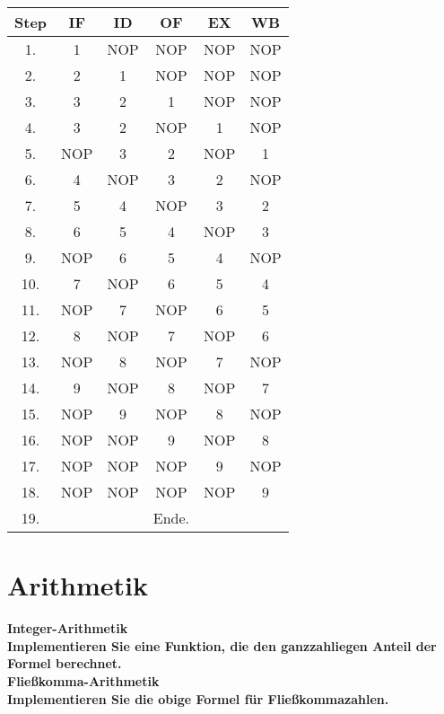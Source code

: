 \documentclass[11pt]{article}
\newcommand{\aufgabe}[1]{\item{\bf #1}}
\begin{document}
\begin{center}
\begin{tabular}{c|c|c|c|c|c}
    Step & IF & ID & OF & EX & WB \\
    \hline
    1. & 1 & NOP & NOP & NOP & NOP \\
    2. & 2 & 1 & NOP & NOP & NOP \\
    3. & 3 & 2 & 1 & NOP & NOP \\
    4. & 3 & 2 & NOP & 1 & NOP \\
    5. & NOP & 3 & 2 & NOP & 1 \\
    6. & 4 & NOP & 3 & 2 & NOP \\
    7. & 5 & 4 & NOP & 3 & 2 \\
    8. & 6 & 5 & 4 & NOP & 3 \\
    9. & NOP & 6 & 5 & 4 & NOP \\
    10. & 7 & NOP & 6 & 5 & 4 \\
    11. & NOP & 7 & NOP & 6 & 5 \\
    12. & 8 & NOP & 7 & NOP & 6 \\
    13. & NOP & 8 & NOP & 7 & NOP \\
    14. & 9 & NOP & 8 & NOP & 7 \\
    15. & NOP & 9 & NOP & 8 & NOP \\
    16. & NOP & NOP & 9 & NOP & 8 \\
    17. & NOP & NOP & NOP & 9 & NOP \\
    18. & NOP & NOP & NOP & NOP & 9 \\
    19. &  &  & Ende. &  & 
\end{tabular}
\end{center}
\section{Arithmetik}
\aufgabe{Integer-Arithmetik \\ Implementieren Sie eine Funktion, die den ganzzahliegen Anteil der Formel berechnet.\\ Fließkomma-Arithmetik \\ Implementieren Sie die obige Formel für Fließkommazahlen.}
\end{document}
